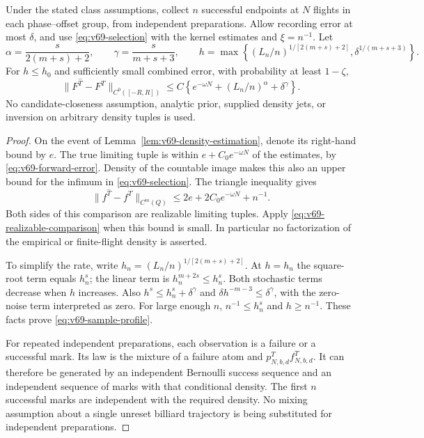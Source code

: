 \begin{theorem}
\label{thm:v69-successful-samples}
Under the stated class assumptions, collect $n$ successful endpoints at
$N$ flights in each phase--offset group, from independent preparations.
Allow recording error at most $\delta$, and use
\eqref{eq:v69-selection} with the kernel estimates and $\xi=n^{-1}$.
Let
\[
 \alpha=\frac{s}{2(m+s)+2},\qquad
 \gamma=\frac{s}{m+s+3},\qquad
 h=\max\left\{(L_n/n)^{1/[2(m+s)+2]},
                    \delta^{1/(m+s+3)}\right\}.
\]
For $h\le h_0$ and sufficiently small combined error, with probability
at least $1-\zeta$,
\begin{equation}\label{eq:v69-sample-profile}
 \|F^{\widehat T}-F^T\|_{C^0([-R,R])}
 \le C\left\{e^{-\omega N}+(L_n/n)^\alpha+\delta^\gamma\right\}.
\end{equation}
No candidate-closeness assumption, analytic prior, supplied density
jets, or inversion on arbitrary density tuples is used.
\end{theorem}
\begin{proof}
On the event of Lemma~\ref{lem:v69-density-estimation}, denote its
right-hand bound by $e$.  The true limiting tuple is within
$e+C_0e^{-\omega N}$ of the estimates, by
\eqref{eq:v69-forward-error}.  Density of the countable image makes
this also an upper bound for the infimum in \eqref{eq:v69-selection}.
The triangle inequality gives
\[
 \|f^{\widehat T}-f^T\|_{C^m(Q)}
                \le 2e+2C_0e^{-\omega N}+n^{-1}.
\]
Both sides of this comparison are realizable limiting tuples.
Apply \eqref{eq:v69-realizable-comparison} when this bound is small.
In particular no factorization of the empirical or finite-flight
density is asserted.

To simplify the rate, write $h_n=(L_n/n)^{1/[2(m+s)+2]}$.
At $h=h_n$ the square-root term equals $h_n^s$; the linear term is
$h_n^{m+2s}\le h_n^s$.  Both stochastic terms decrease when $h$
increases.  Also $h^s\le h_n^s+\delta^\gamma$ and
$\delta h^{-m-3}\le\delta^\gamma$, with the zero-noise term
interpreted as zero.  For large enough $n$, $n^{-1}\le h_n^s$ and
$h\ge n^{-1}$.  These facts prove \eqref{eq:v69-sample-profile}.

For repeated independent preparations, each observation is a failure
or a successful mark.  Its law is the mixture of a failure atom and
$p^T_{N,b,d}f^T_{N,b,d}$.  It can therefore be generated by an
independent Bernoulli success sequence and an independent sequence of
marks with that conditional density.  The first $n$ successful marks
are independent with the required density.  No mixing assumption about
a single unreset billiard trajectory is being substituted for independent
preparations.
\end{proof}

